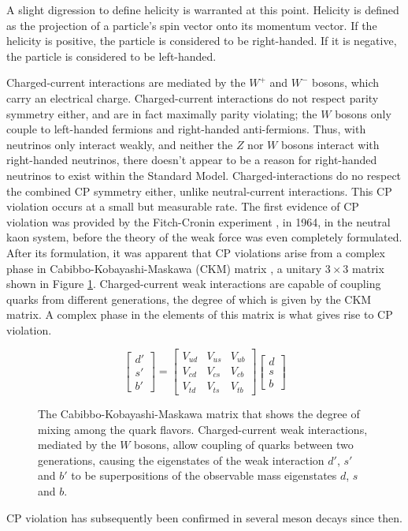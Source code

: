 \documentclass[11pt,a4paper,openright,twoside]{report}
\begin{document}
A slight digression to define helicity is warranted at this point. Helicity is defined as the projection of a particle's spin vector onto its momentum vector. If the helicity is positive, the particle is considered to be right-handed. If it is negative, the particle is considered to be left-handed.

Charged-current interactions are mediated by the $W^+$ and $W^-$ bosons, which carry an electrical charge. Charged-current interactions do not respect parity symmetry either, and are in fact maximally parity violating; the $W$ bosons only couple to left-handed fermions and right-handed anti-fermions. Thus, with neutrinos only interact weakly, and neither the $Z$ nor $W$ bosons interact with right-handed neutrinos, there doesn't appear to be a reason for right-handed neutrinos to exist within the Standard Model. Charged-interactions do no respect the combined CP symmetry either, unlike neutral-current interactions. This CP violation occurs at a small but measurable rate. The first evidence of CP violation was provided by the Fitch-Cronin experiment \cite{cronin_fitch}, in 1964, in the neutral kaon system, before the theory of the weak force was even completely formulated. After its formulation, it was apparent that CP violations arise from a complex phase in Cabibbo-Kobayashi-Maskawa (CKM) matrix \cite{CKM}, a unitary $3\times 3$ matrix shown in Figure \ref{fig:CKM matrix}. Charged-current weak interactions are capable of coupling quarks from different generations, the degree of which is given by the CKM matrix. A complex phase in the elements of this matrix is what gives rise to CP violation.
\begin{figure}[H]
\[
\begin{bmatrix}
d'\\
s'\\
b'
\end{bmatrix}
=
\begin{bmatrix}
V_{ud} & V_{us} & V_{ub}\\
V_{cd} & V_{cs} & V_{cb}\\
V_{td} & V_{ts} & V_{tb}
\end{bmatrix}
\begin{bmatrix}
d\\
s\\
b
\end{bmatrix}
\]
\caption{The Cabibbo-Kobayashi-Maskawa matrix that shows the degree of mixing among the quark flavors. Charged-current weak interactions, mediated by the $W$ bosons, allow coupling of quarks between two generations, causing the eigenstates of the weak interaction $d'$, $s'$ and $b'$ to be superpositions of the observable mass eigenstates $d$, $s$ and $b$.}
\label{fig:CKM matrix}
\end{figure}
CP violation has subsequently been confirmed in several meson decays\cite{CP1,CP2,CP3,CP4,CP5,CP6} since then.
\end{document}
